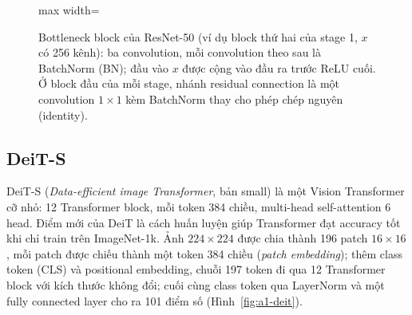 \documentclass[11pt,a4paper]{article}
\begin{document}
\begin{figure}[!htb]
\centering
\begin{adjustbox}{max width=\linewidth}
\end{adjustbox}
\caption{Bottleneck block của ResNet-50 (ví dụ block thứ hai của stage 1, \(x\) có 256 kênh): ba convolution, mỗi convolution theo sau là BatchNorm (BN); đầu vào \(x\) được cộng vào đầu ra trước ReLU cuối. Ở block đầu của mỗi stage, nhánh residual connection là một convolution \(1{\times}1\) kèm BatchNorm thay cho phép chép nguyên (identity).}
\label{fig:a1-block}
\end{figure}

\FloatBarrier

\subsection{DeiT-S}\label{sec:a1-deit}
DeiT-S (\emph{Data-efficient image Transformer}, bản small) là một Vision Transformer cỡ nhỏ: 12 Transformer block, mỗi token 384 chiều, multi-head self-attention 6 head. Điểm mới của DeiT là cách huấn luyện giúp Transformer đạt accuracy tốt khi chỉ train trên ImageNet-1k. Ảnh \(224\times224\) được chia thành 196 patch \(16\times16\), mỗi patch được chiếu thành một token 384 chiều (\emph{patch embedding}); thêm class token (CLS) và positional embedding, chuỗi 197 token đi qua 12 Transformer block với kích thước không đổi; cuối cùng class token qua LayerNorm và một fully connected layer cho ra 101 điểm số (Hình~\ref{fig:a1-deit}).
\end{document}
